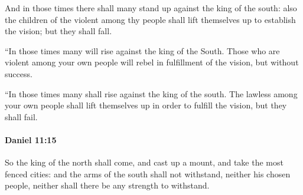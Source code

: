 			\begin{versebox}
					\item[BHS] 
					\item[LXX] 
					\item[ASV] And in those times there shall many stand up against the king of the south: also the children of the violent among thy people shall lift themselves up to establish the vision; but they shall fall.
					\item[NIV] “In those times many will rise against the king of the South. Those who are violent among your own people will rebel in fulfillment of the vision, but without success.
					\item[NRSV] “In those times many shall rise against the king of the south. The lawless among your own people shall lift themselves up in order to fulfill the vision, but they shall fail.
			\end{versebox}

		\paragraph{Daniel 11:15} %
			\label{DANIEL-11-15}

			So the king of the north shall come, and cast up a mount, and take the most fenced cities: and the arms of the south shall not withstand, neither his chosen people, neither shall there be any strength to withstand.

